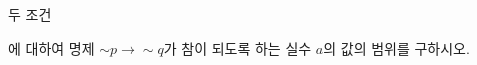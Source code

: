 두 조건\par\smallskip{}\par\smallskip\noindent 에 대하여 명제 ${\sim}p\longrightarrow {\sim}q$가 참이 되도록 하는 실수 $a$의 값의 범위를 구하시오.
